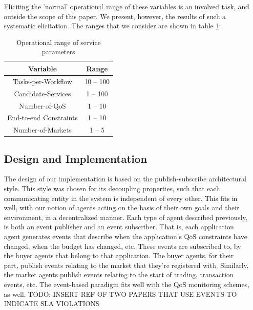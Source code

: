 \documentclass[10pt,journal,compsoc]{IEEEtran}
\begin{document}
Eliciting the 'normal' operational range of these variables is an involved task, and outside the scope of this paper. We present, however, the results of such a systematic elicitation. The ranges that we consider are shown in table \ref{scaling_range}:
\begin{center}
\begin{table}
\begin{tabular}{|c|c|}
\hline
\textbf{Variable} &  \textbf{Range} \\ \hline
Tasks-per-Workflow & 10 -- 100 \\ \hline
Candidate-Services & 1 -- 100 \\ \hline
Number-of-QoS & 1 -- 10 \\ \hline
End-to-end Constraints & 1 -- 10 \\ \hline
Number-of-Markets & 1 -- 5 \\ \hline
\end{tabular}
 \label{scaling_range}
 \caption{Operational range of service parameters}
\end{table}
\end{center}

\subsection{Design and Implementation}
The design of our implementation is based on the publish-subscribe architectural style. This style was chosen for its decoupling properties, such that each communicating entity in the system is independent of every other. This fits in well, with our notion of agents acting on the basis of their own goals and their environment, in a decentralized manner. Each type of agent described previously, is both an event publisher and an event subscriber. That is, each application agent generates events that describe when the application's QoS constraints have changed, when the budget has changed, etc. These events are subscribed to, by the buyer agents that belong to that application. The buyer agents, for their part, publish events relating to the market that they're registered with. Similarly, the market agents publish events relating to the start of trading, transaction events, etc. The event-based paradigm fits well with the QoS monitoring schemes, as well. {TODO: INSERT REF OF TWO PAPERS THAT USE EVENTS TO INDICATE SLA VIOLATIONS}\\
\end{document}
